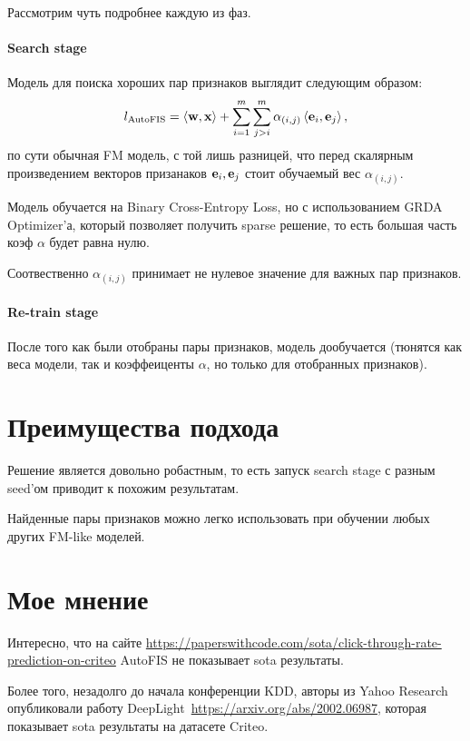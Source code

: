 Рассмотрим чуть подробнее каждую из фаз.

\paragraph{Search stage} 

Модель для поиска хороших пар признаков выглядит следующим образом:
\begin{equation*}
    l_{\text {AutoFIS}}=\langle {\bf w}, {\bf x}\rangle+\sum_{i=1}^{m} \sum_{j>i}^{m} \alpha_{(i, j)}\left\langle {\bf e}_{i}, {\bf e}_{j}\right\rangle ,
\end{equation*}
по сути обычная FM модель, с той лишь разницей, что перед скалярным произведением векторов призанаков ${\bf e}_{i}, {\bf e}_{j}$ стоит обучаемый вес $\alpha_{(i, j)}$.

Модель обучается на Binary Cross-Entropy Loss, но с использованием GRDA Optimizer'а, который позволяет получить sparse решение, то есть большая часть коэф $\alpha$ будет равна нулю.

Соотвественно $\alpha_{(i, j)}$ принимает не нулевое значение для важных пар признаков.

\paragraph{Re-train stage}

После того как были отобраны пары признаков, модель дообучается (тюнятся как веса модели, так и коэффеиценты $\alpha$, но только для отобранных признаков).

\section*{Преимущества подхода}

Решение является довольно робастным, то есть запуск search stage с разным seed'ом приводит к похожим результатам.

Найденные пары признаков можно легко использовать при обучении любых других FM-like моделей.

\section*{Мое мнение}

Интересно, что на сайте \url{https://paperswithcode.com/sota/click-through-rate-prediction-on-criteo} AutoFIS не показывает sota результаты. 

Более того, незадолго до начала конференции KDD, авторы из Yahoo Research опубликовали работу DeepLight~\url{https://arxiv.org/abs/2002.06987}, которая показывает sota результаты на датасете Criteo.